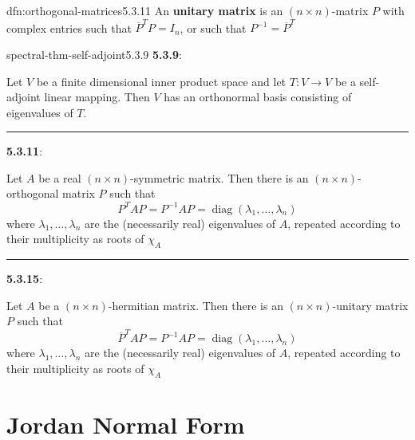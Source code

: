 \documentclass[landscape, 8pt]{extarticle}
\DeclareMathOperator{\Mat}{Mat}
\DeclareMathOperator{\diag}{diag}
\begin{document}
\begin{multicols}{3}
\begin{dfn}{dfn:orthogonal-matrices}{5.3.11}
    An \textbf{unitary matrix} is an $(n \times n)$-matrix $P$ with complex entries such that $\overline{P}^{T}P = I_{n}$, or such that $P^{-1} = \overline{P}^{T}$
\end{dfn}

\begin{thm}{spectral-thm-self-adjoint}{5.3.9}
    \textbf{5.3.9}: \underline{}
    
    Let $V$ be a finite dimensional inner product space and let $T : V \to V$ be a self-adjoint linear mapping. Then $V$ has an orthonormal basis consisting of eigenvalues of $T$.

    \noindent\rule{\textwidth}{0.2pt}
    \textbf{5.3.11}: \underline{}

    Let $A$ be a real $(n \times n)$-symmetric matrix. Then there is an $(n \times n)$-orthogonal matrix $P$ such that
    \[P^{T} A P = P^{-1}AP = \diag(\lambda_{1},\dots,\lambda_{n})\]
    where $\lambda_{1},\dots,\lambda_{n}$ are the (necessarily real) eigenvalues of $A$, repeated according to their multiplicity as roots of $\chi_{A}$

    \noindent\rule{\textwidth}{0.2pt}
    \textbf{5.3.15}: \underline{}

    Let $A$ be a $(n \times n)$-hermitian matrix. Then there is an $(n \times n)$-unitary matrix $P$ such that
    \[\overline{P}^{T} A P = P^{-1}AP = \diag(\lambda_{1},\dots,\lambda_{n})\]
    where $\lambda_{1},\dots,\lambda_{n}$ are the (necessarily real) eigenvalues of $A$, repeated according to their multiplicity as roots of $\chi_{A}$
\end{thm}

\section{Jordan Normal Form}



\end{multicols}
\end{document}
